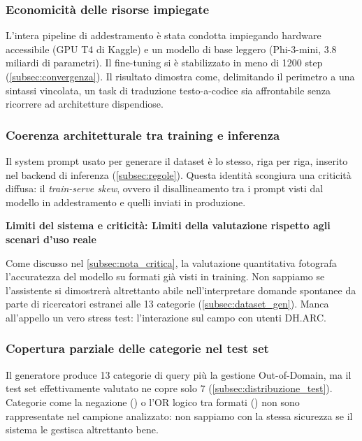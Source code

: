 \subsubsection{Economicità delle risorse impiegate}

L'intera pipeline di addestramento è stata condotta impiegando hardware accessibile (GPU T4 di Kaggle) e un modello di base leggero (Phi-3-mini, 3.8 miliardi di parametri). Il fine-tuning si è stabilizzato in meno di 1200 step (\cref{subsec:convergenza}). Il risultato dimostra come, delimitando il perimetro a una sintassi vincolata, un task di traduzione testo-a-codice sia affrontabile senza ricorrere ad architetture dispendiose.

\subsubsection{Coerenza architetturale tra training e inferenza}

Il system prompt usato per generare il dataset è lo stesso, riga per riga, inserito nel backend di inferenza (\cref{subsec:regole}). Questa identità scongiura una criticità diffusa: il \textit{train-serve skew}, ovvero il disallineamento tra i prompt visti dal modello in addestramento e quelli inviati in produzione.

\textbf{Limiti del sistema e criticità: Limiti della valutazione rispetto agli scenari d'uso reale}

Come discusso nel \cref{subsec:nota_critica}, la valutazione quantitativa fotografa l'accuratezza del modello su formati già visti in training. Non sappiamo se l'assistente si dimostrerà altrettanto abile nell'interpretare domande spontanee da parte di ricercatori estranei alle 13 categorie (\cref{subsec:dataset_gen}). Manca all'appello un vero stress test: l'interazione sul campo con utenti DH.ARC.\@

\subsubsection{Copertura parziale delle categorie nel test set}

Il generatore produce 13 categorie di query più la gestione Out-of-Domain, ma il test set effettivamente valutato ne copre solo 7 (\cref{subsec:distribuzione_test}). Categorie come la negazione () o l'OR logico tra formati () non sono rappresentate nel campione analizzato: non sappiamo con la stessa sicurezza se il sistema le gestisca altrettanto bene.

